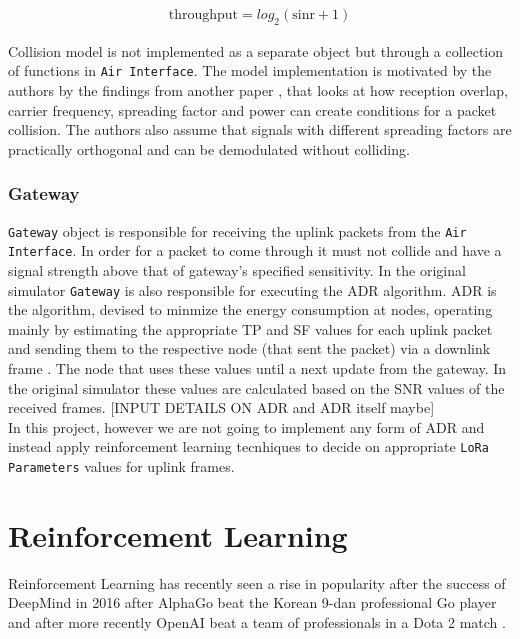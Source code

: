 \begin{align*}
    \text{throughput} = \text{$log_{2}$}(\text{sinr} + 1)
\end{align*}

Collision model is not implemented as a separate object but through a collection of functions in \texttt{Air Interface}. The model implementation is motivated by the authors \cite{simulator} by the findings from another paper \cite{collision_conditions}, that looks at how reception overlap, carrier frequency, spreading factor and power can create conditions for a packet collision. The authors \cite{simulator} also assume that signals with different spreading factors are practically orthogonal and can be demodulated without colliding.

\subsection{Gateway}

\texttt{Gateway} object is responsible for receiving 
the uplink packets from the \texttt{Air Interface}. In order for a packet to come through it must not collide and have  a signal strength above that of gateway's specified sensitivity. In the original simulator \cite{simulator} \texttt{Gateway} is also responsible for executing the ADR algorithm. ADR is the algorithm, devised to minmize the energy consumption at nodes, operating mainly by estimating the appropriate TP and SF values for each uplink packet and sending them to the respective node (that sent the packet) via a downlink frame \cite{simulator}. The node that uses these values until a next update from the gateway. In the original simulator these values are calculated based on the SNR values of the received frames. 
[INPUT DETAILS ON ADR and ADR itself maybe] \\

In this project, however we are not going to implement any form of ADR and instead apply reinforcement learning tecnhiques to 
decide on appropriate \texttt{LoRa Parameters} values for uplink frames.



\chapter{Reinforcement Learning} 

Reinforcement Learning has recently seen a rise in popularity after
the success of DeepMind in 2016 after AlphaGo beat the Korean 9-dan professional Go player \cite{alpha_go_lee_sedol} and after more recently OpenAI beat a team of professionals in a Dota 2 match \cite{dota}.\\

